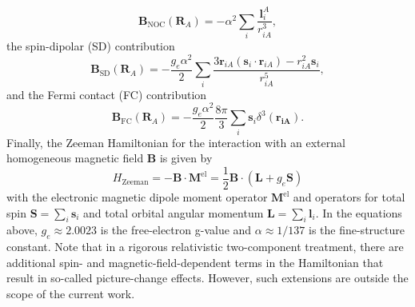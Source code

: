 	\begin{equation}{{\mathbf{B}}_{{\text{NOC}}}}({{\mathbf{R}}_A}) =  - {\alpha ^2}\sum\limits_i {\frac{{{\mathbf{l}}_i^A}}{{r_{iA}^3}}}, 
	\end{equation} 
the spin-dipolar (SD) contribution
	\begin{equation}{{\mathbf{B}}_{{\text{SD}}}}({{\mathbf{R}}_A}) =  - \frac{{{g_e}{\alpha ^2}}}{2}\sum\limits_i { {\frac{{3{{\mathbf{r}}_{iA}}({{\mathbf{s}}_i} \cdot {{\mathbf{r}}_{iA}}) - r_{iA}^2{{\mathbf{s}}_i}}}{{r_{iA}^5}}} }, 
	\end{equation}
and the Fermi contact (FC) contribution
	\begin{equation}{{\mathbf{B}}_{{\text{FC}}}}({{\mathbf{R}}_A}) =  - \frac{{{g_e}{\alpha ^2}}}{2}\frac{{8\pi }}{3}\sum\limits_i {{{\mathbf{s}}_i}} {\delta ^3}({{\mathbf{r}}_{{\mathbf{iA}}}}).
	\end{equation}
Finally, the Zeeman Hamiltonian for the interaction with an external homogeneous magnetic field ${\mathbf{B}}$ is given by
	\begin{equation}
	\label{Eq:HZeeman}
	{H_{{\text{Zeeman}}}} =  - {\mathbf{B}} \cdot {{\mathbf{M}}^{{\text{el}}}} = \frac{1}{2}{\mathbf{B}} \cdot ({\mathbf{L}} + {g_e}{\mathbf{S}})
	\end{equation}
with the electronic magnetic dipole moment operator ${{\mathbf{M}}^{{\text{el}}}}$ and operators for total spin ${\mathbf{S}} = \sum\limits_i {{{\mathbf{s}}_i}} $ and total orbital angular momentum ${\mathbf{L}} = \sum\limits_i {{{\mathbf{l}}_i}} $.
In the equations above, ${g_e} \approx 2.0023$ is the free-electron g-value and $\alpha  \approx 1/137$ is the fine-structure constant.
Note that in a rigorous relativistic two-component treatment, there are additional spin- and magnetic-field-dependent terms in the Hamiltonian that result in so-called picture-change effects.\cite{SandhKN_2013_104102, SandhN_2012_94102} However, such extensions are outside the scope of the current work.

